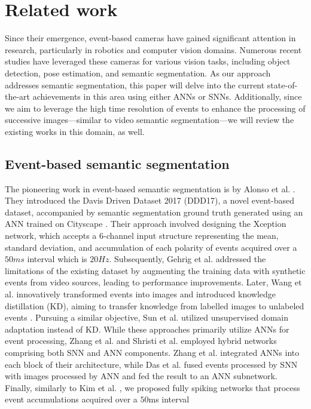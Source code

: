 \section{Related work}
\label{related}
Since their emergence, event-based cameras have gained significant attention in research, particularly in robotics and computer vision domains. Numerous recent studies have leveraged these cameras for various vision tasks, including object detection, pose estimation, and semantic segmentation. As our approach addresses semantic segmentation, this paper will delve into the current state-of-the-art achievements in this area using either ANNs or SNNs. Additionally, since we aim to leverage the high time resolution of events to enhance the processing of successive images—similar to video semantic segmentation—we will review the existing works in this domain, as well.
\subsection{Event-based semantic segmentation}
The pioneering work in event-based semantic segmentation is by Alonso et al. \cite{alonso2019ev}. They introduced the Davis Driven Dataset 2017 (DDD17), a novel event-based dataset, accompanied by semantic segmentation ground truth generated using an ANN trained on Cityscape \cite{cordts2016cityscapes}. Their approach involved designing the Xception network, which accepts a $6$-channel input structure representing the mean, standard deviation, and accumulation of each polarity of events acquired over a $50ms$ interval which is $20Hz$. Subsequently, Gehrig et al. \cite{gehrig2020video} addressed the limitations of the existing dataset by augmenting the training data with synthetic events from video sources, leading to performance improvements. Later, Wang et al. \cite{wang2021dual} innovatively transformed events into images and introduced knowledge distillation (KD), aiming to transfer knowledge from labelled images to unlabeled events \cite{wang2021evdistill}. Pursuing a similar objective, Sun et al. \cite{sun2022ess} utilized unsupervised domain adaptation instead of KD. While these approaches primarily utilize ANNs for event processing, Zhang et al. \cite{zhang2023energy} and Shristi et al. \cite{das2024halsie} employed hybrid networks comprising both SNN and ANN components. Zhang et al. \cite{zhang2023energy} integrated ANNs into each block of their architecture, while Das et al. \cite{das2024halsie} fused events processed by SNN with images processed by ANN and fed the result to an ANN subnetwork. Finally, similarly to Kim et al. \cite{kim2022beyond}, we proposed fully spiking networks that process event accumulations acquired over a $50$ms interval \cite{hareb2024evsegsnn}
 
